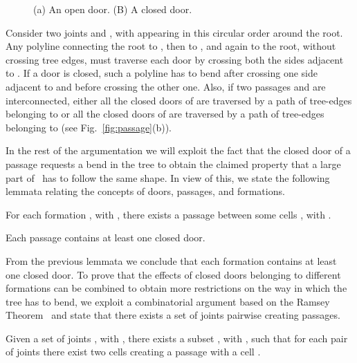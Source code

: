\documentclass[a4paper,10pt]{llncs}
\newcounter{prop}
\newcommand{\T}{\mbox{ }}
\begin{document}
\begin{figure}[hb]
\caption{(a) An open door. (B) A closed door.}\label{fig:door}
\end{figure}

Consider two joints  and , with  appearing in this circular order around the root. Any polyline connecting the root to , then to , and again to the root, without crossing tree edges, must traverse each door by crossing both the sides adjacent to . If a door is closed, such a polyline has to bend after crossing one side adjacent to  and before crossing the other one.
Also, if two passages  and  are interconnected, either all the closed doors of  are traversed by a path of tree-edges belonging to  or all the closed doors of  are traversed by a path of tree-edges belonging to  (see Fig.~\ref{fig:passage}(b)).

In the rest of the argumentation we will exploit the fact that the closed door of a passage requests a bend in the tree to obtain the claimed property that a large part of \T has to follow the same shape. In view of this, we state the following lemmata relating the concepts of doors, passages, and formations.

\begin{lemma}\label{lemma:PS_passage}
For each formation , with , there exists a passage between some cells , with .
\end{lemma}

\begin{lemma}\label{lemma:closed_door_in_each_passage}
Each passage contains at least one closed door.
\end{lemma}

From the previous lemmata we conclude that each formation contains at least one closed door. To prove that the effects of closed doors belonging to different formations can be combined to obtain more restrictions on the way in which the tree has to bend, we exploit a combinatorial argument based on the Ramsey Theorem~\cite{grs-rt-90} and state that there exists a set of joints pairwise creating passages.

\begin{lemma}\label{lemma:k_cluster_passage}
Given a set of joints , with , there exists a subset , with , such that for each pair of joints  there exist two cells  creating a passage with a cell .
\end{lemma}
\end{document}
